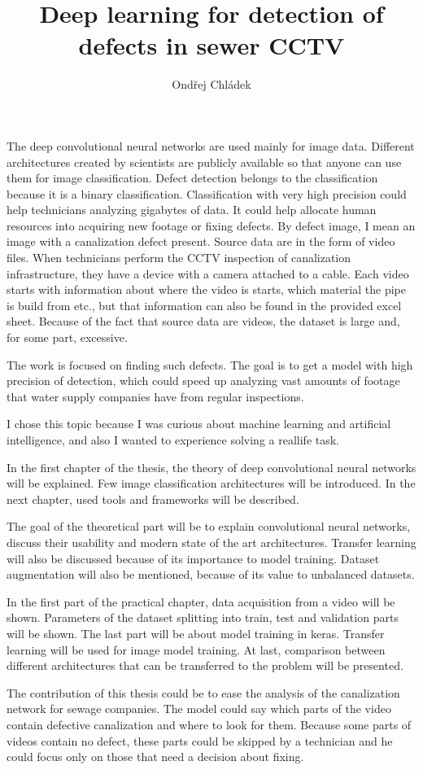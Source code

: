 \documentclass[thesis=B,english]{FITthesis}[2019/12/23]
\title{Deep learning for detection of defects in sewer CCTV}
\author{Ondřej Chládek} %
\begin{document}

\begin{introduction}
    The deep convolutional neural networks are used mainly for image data. Different architectures created by scientists are publicly available so that anyone can use them for image classification. Defect detection belongs to the classification because it is a binary classification. Classification with very high precision could help technicians analyzing gigabytes of data. It could help allocate human resources into acquiring new footage or fixing defects. By defect image, I mean an image with a canalization defect present. Source data are in the form of video files. When technicians perform the CCTV inspection of canalization infrastructure, they have a device with a camera attached to a cable. Each video starts with information about where  the video is starts, which material the pipe is build from etc., but that information can also be found in the provided excel sheet. Because of the fact that source data are videos, the dataset is large and, for some part, excessive.
    
    The work is focused on finding such defects. The goal is to get a model with high precision of detection, which could speed up analyzing vast amounts of footage that water supply companies have from regular inspections.
    
    I chose this topic because I was curious about machine learning and artificial intelligence, and also I wanted to experience solving a reallife task.
    
    In the first chapter of the thesis, the theory of deep convolutional neural networks will be explained. Few image classification architectures will be introduced. In the next chapter, used tools and frameworks will be described.
    
    The goal of the theoretical part will be to explain convolutional neural networks, discuss their usability and modern state of the art architectures. Transfer learning will also be discussed because of its importance to model training. Dataset augmentation will also be mentioned, because of its value to unbalanced datasets.
    
    In the first part of the practical chapter, data acquisition from a video will be shown. Parameters of the dataset splitting into train, test and validation parts will be shown. The last part will be about model training in keras. Transfer learning will be used for image model training. At last, comparison between different architectures that can be transferred to the problem will be presented.
    
    The contribution of this thesis could be to ease the analysis of the canalization network for sewage companies. The model could say which parts of the video contain defective canalization and where to look for them. Because some parts of videos contain no defect, these parts could be skipped by a technician and he could focus only on those that need a decision about fixing. 
\end{introduction}
\end{document}
